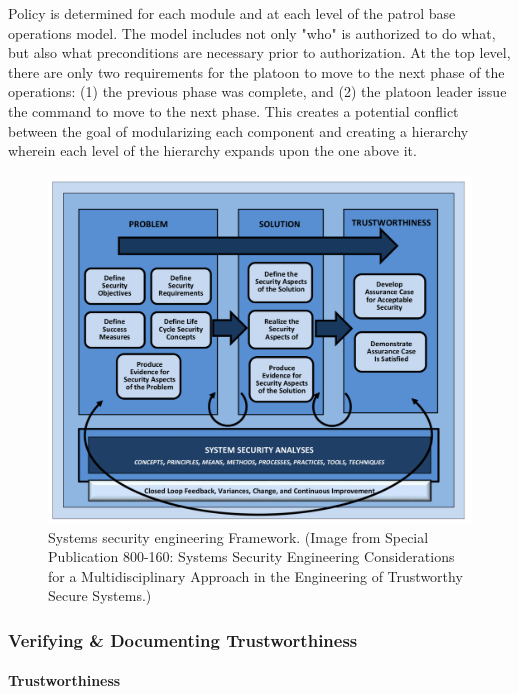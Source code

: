 \documentclass[../../main/main.tex]{subfiles}
\begin{document}
Policy is determined for each module and at each level of the patrol base operations model.  The model includes not only "who" is authorized to do what, but also what preconditions are necessary prior to authorization.  At the top level, there are only two requirements for the platoon to move to the next phase of the operations: (1) the previous phase was complete, and (2) the platoon leader issue the command to move to the next phase.  This creates a potential conflict between the goal of modularizing each component and creating a hierarchy wherein each level of the hierarchy expands upon the one above it.  

\begin{figure}[h]
\includegraphics[width=\linewidth]{../figures/sseframework}
\caption{\label{sseframework}Systems security engineering Framework. (Image from  Special Publication 800-160: Systems Security Engineering Considerations for a Multidisciplinary Approach in the Engineering of Trustworthy Secure Systems.)}
\end{figure}

\subsubsection{Verifying \& Documenting Trustworthiness}\label{sssec:sseframework}

\paragraph*{Trustworthiness}
\end{document}

